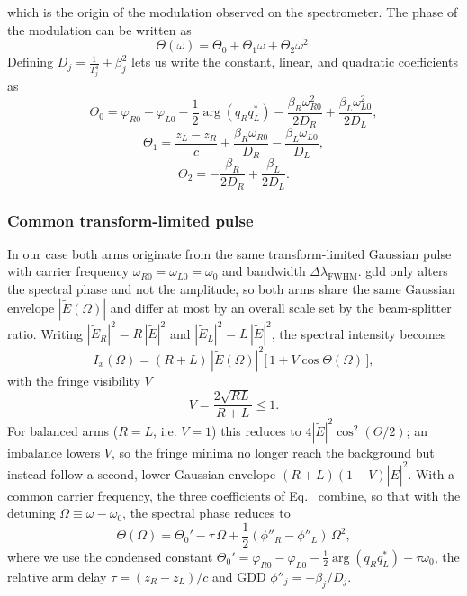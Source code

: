 which is the origin of the modulation observed on the spectrometer. The phase of the modulation can be written as
\begin{equation}
    \Theta(\omega) = \Theta_0+\Theta_1\omega+\Theta_2\omega^2.
    \label{eq:spectrum_phase}
\end{equation}
Defining $D_j=\frac{1}{T_j^4}+\beta_j^2$ lets us write the constant, linear, and quadratic coefficients as
\begin{equation}
    \Theta_0 = \varphi_{R0}-\varphi_{L0} -\frac{1}{2}\arg(q_Rq_L^*) -\frac{\beta_R\omega_{R0}^2}{2D_R} +\frac{\beta_L\omega_{L0}^2}{2D_L},
    \label{eq:theta0}
\end{equation}
\begin{equation}
    \Theta_1 = \frac{z_L-z_R}{c} + \frac{\beta_R\omega_{R0}}{D_R} - \frac{\beta_L\omega_{L0}}{D_L},
    \label{eq:theta1}
\end{equation}
\begin{equation}
    \Theta_2 = -\frac{\beta_R}{2D_R} + \frac{\beta_L}{2D_L}.
    \label{eq:theta2}
\end{equation}

\subsubsection{Common transform-limited pulse}

In our case both arms originate from the same transform-limited Gaussian pulse with carrier frequency $\omega_{R0}=\omega_{L0}=\omega_0$ and bandwidth $\Delta\lambda_\mathrm{FWHM}$. \gls{gdd} only alters the spectral phase and not the amplitude, so both arms share the same Gaussian envelope $|\tilde E(\Omega)|$ and differ at most by an overall scale set by the beam-splitter ratio. Writing $|\tilde E_R|^2=R\,|\tilde E|^2$ and $|\tilde E_L|^2=L\,|\tilde E|^2$, the spectral intensity becomes
\begin{equation}
    I_x(\Omega)=(R+L)\,|\tilde E(\Omega)|^2\big[\,1+V\cos\Theta(\Omega)\,\big],
    \label{eq:spectral_intensity_common}
\end{equation}
with the fringe visibility $V$
\begin{equation}
    V=\frac{2\sqrt{RL}}{R+L}\le 1.
    \label{eq:visibility}
\end{equation}
For balanced arms ($R=L$, i.e. $V=1$) this reduces to $4|\tilde E|^2\cos^2(\Theta/2)$; an imbalance lowers $V$, so the fringe minima no longer reach the background but instead follow a second, lower Gaussian envelope $(R+L)(1-V)|\tilde E|^2$.
With a common carrier frequency, the three coefficients of Eq.~ combine, so that with the detuning $\Omega\equiv\omega-\omega_0$, the spectral phase reduces to
\begin{equation}
    \Theta(\Omega) = \Theta_0' - \tau\,\Omega + \frac{1}{2}(\phi''_R - \phi''_L)\,\Omega^2 ,
    \label{eq:spectrum_phase_common}
\end{equation}
where we use the condensed constant $\Theta_0'=\varphi_{R0}-\varphi_{L0}-\tfrac12\arg(q_Rq_L^*)-\tau\omega_0$, the relative arm delay $\tau=(z_R-z_L)/c$ and GDD $\phi''_j = -\beta_j/D_j$.

